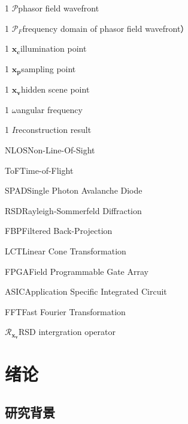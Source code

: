 \documentclass[master]{shtthesis}             %
\makeatletter
\def\ifgraduate{\ifsht@graduate}
\makeatother
\begin{document}
\ifgraduate
\begin{nomenclatures}
  \item[1]{$\mathcal{P}$}{phasor field wavefront}
  \item[1]{$\mathcal{P}_F$}{frequency domain of phasor field wavefront）}
  \item[1]{$\mathbf{x_c}$}{illumination point}
  \item[1]{$\mathbf{x_p}$}{sampling point}
  \item[1]{$\mathbf{x_v}$}{hidden scene point}
  \item[1]{$\omega$}{angular frequency}
  \item[1]{$I$}{reconstruction result}
\end{nomenclatures}

\begin{nomenclatures}[缩写]
  \item{NLOS}{Non-Line-Of-Sight}
  \item{ToF}{Time-of-Flight}
  \item{SPAD}{Single Photon Avalanche Diode}
  \item{RSD}{Rayleigh-Sommerfeld Diffraction}
  \item{FBP}{Filtered Back-Projection}
  \item{LCT}{Linear Cone Transformation}
  \item{FPGA}{Field Programmable Gate Array}
  \item{ASIC}{Application Specific Integrated Circuit}
  \item{FFT}{Fast Fourier Transformation}
\end{nomenclatures}

\begin{nomenclatures}[算子 \& 说明]
  \item{$\mathcal{R}_{\mathbf{x_v}}$}{RSD intergration operator}
\end{nomenclatures}
\fi

\mainmatter
\chapter{绪论}

\section{研究背景}\label{sec:backgd}
\end{document}
